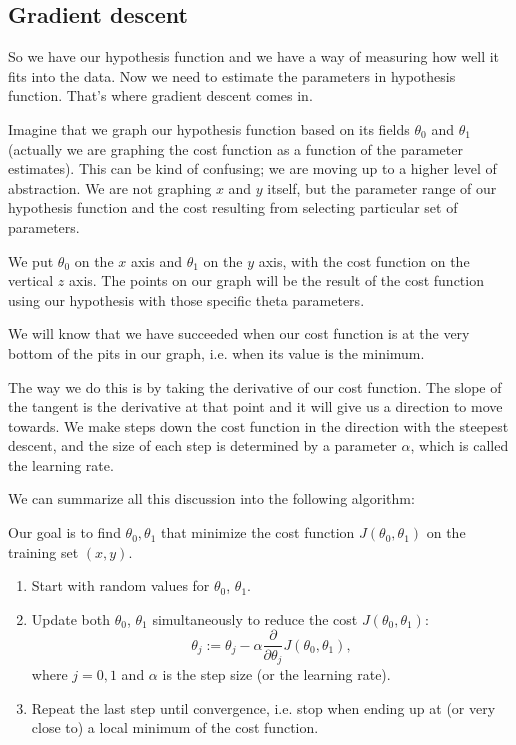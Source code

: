 \documentclass[a4paper,11pt]{report}
\begin{document}
\subsection*{Gradient descent}

So we have our hypothesis function and we have a way of measuring how well it fits into the data. Now we need to estimate the parameters in hypothesis function. That's where gradient descent comes in.

Imagine that we graph our hypothesis function based on its fields $\theta_0$ and $\theta_1$ (actually we are graphing the cost function as a function of the parameter estimates). This can be kind of confusing; we are moving up to a higher level of abstraction. We are not graphing $x$ and $y$ itself, but the parameter range of our hypothesis function and the cost resulting from selecting particular set of parameters.

We put $\theta_0$ on the $x$ axis and $\theta_1$ on the $y$ axis, with the cost function on the vertical $z$ axis. The points on our graph will be the result of the cost function using our hypothesis with those specific theta parameters.

We will know that we have succeeded when our cost function is at the very bottom of the pits in our graph, i.e. when its value is the minimum.

The way we do this is by taking the derivative of our cost function. The slope of the tangent is the derivative at that point and it will give us a direction to move towards. We make steps down the cost function in the direction with the steepest descent, and the size of each step is determined by a parameter $\alpha$, which is called the learning rate.

We can summarize all this discussion into the following algorithm:

Our goal is to find $\theta_0, \theta_1$ that minimize the cost function $J(\theta_0, \theta_1)$ on the training set $(x, y)$.

\begin{enumerate}
  \item Start with random values for $\theta_0$, $\theta_1$.
  \item Update both $\theta_0$, $\theta_1$ simultaneously to reduce the cost $J(\theta_0, \theta_1)$:
        \begin{equation}\label{eq:lin-reg-gd}
        \theta_j := \theta_j - \alpha \frac{\partial}{\partial \theta_j} J(\theta_0, \theta_1),
        \end{equation}
        where $j=0,1$ and $\alpha$ is the step size (or the learning rate).
  \item Repeat the last step until convergence, i.e. stop when ending up at (or very close to) a local minimum of the cost function.
\end{enumerate}
\end{document}
